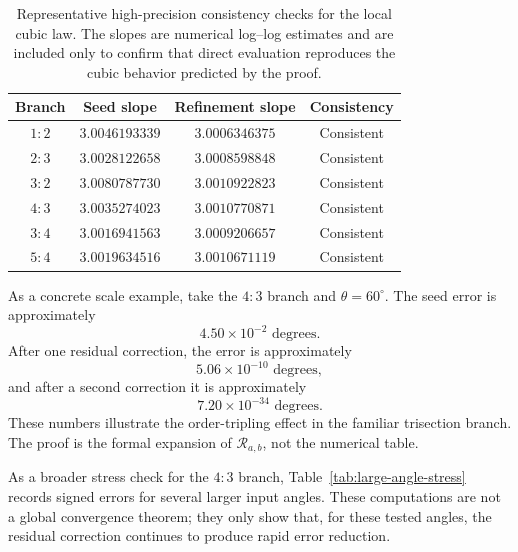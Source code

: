 \documentclass[11pt]{article}
\theoremstyle{definition}
\theoremstyle{remark}
\newcommand{\Rop}{\mathscr{R}}
\begin{document}
\begin{table}[h]
\centering
\begin{tabular}{cccc}
\toprule
Branch & Seed slope & Refinement slope & Consistency \\
\midrule
$1:2$ & $3.0046193339$ & $3.0006346375$ & Consistent \\
$2:3$ & $3.0028122658$ & $3.0008598848$ & Consistent \\
$3:2$ & $3.0080787730$ & $3.0010922823$ & Consistent \\
$4:3$ & $3.0035274023$ & $3.0010770871$ & Consistent \\
$3:4$ & $3.0016941563$ & $3.0009206657$ & Consistent \\
$5:4$ & $3.0019634516$ & $3.0010671119$ & Consistent \\
\bottomrule
\end{tabular}
\caption{Representative high-precision consistency checks for the local cubic
law.  The slopes are numerical log--log estimates and are included only to
confirm that direct evaluation reproduces the cubic behavior predicted by the
proof.}
\label{tab:numerical-slopes}
\end{table}

As a concrete scale example, take the $4:3$ branch and $\theta=60^\circ$.  The
seed error is approximately
\[
4.50\times 10^{-2}\text{ degrees}.
\]
After one residual correction, the error is approximately
\[
5.06\times 10^{-10}\text{ degrees},
\]
and after a second correction it is approximately
\[
7.20\times 10^{-34}\text{ degrees}.
\]
These numbers illustrate the order-tripling effect in the familiar trisection
branch.  The proof is the formal expansion of $\Rop_{a,b}$, not the numerical
table.

As a broader stress check for the $4:3$ branch,
Table~\ref{tab:large-angle-stress} records signed errors for several larger
input angles.  These computations are not a global convergence theorem; they
only show that, for these tested angles, the residual correction continues to
produce rapid error reduction.
\end{document}
